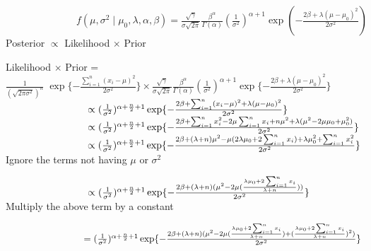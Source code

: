 \documentclass[]{article}
\begin{document}
$\hspace{3cm} f(\mu, \sigma^{2}\mid \mu_{0}, \lambda,\alpha,\beta) =  \frac{\sqrt{\gamma}}{\sigma\sqrt{2\pi}} \frac{\beta^{\alpha}}{\Gamma(\alpha)} (\frac{1}{\sigma^{2}})^{\alpha + 1} \exp(-\frac{2\beta + \lambda(\mu - \mu_{0})^{2}}{2\sigma^{2}}) $\\

Posterior $\propto$ Likelihood $\times$ Prior 

Likelihood $\times$ Prior = $\frac{1}{(\sqrt{2\pi \sigma^{2}})^{n}} \;\exp\{-\frac{\sum_{i=1}^{n}(x_{i}-\mu)^{2}}{2\sigma^{2}}\} \times \frac{\sqrt{\gamma}}{\sigma\sqrt{2\pi}} \frac{\beta^{\alpha}}{\Gamma(\alpha)} (\frac{1}{\sigma^{2}})^{\alpha + 1} \exp\{-\frac{2\beta + \lambda(\mu - \mu_{0})^{2}}{2\sigma^{2}}\}$\\

$\hspace{2.9cm} \propto (\frac{1}{\sigma^{2}})^{\alpha + \frac{n}{2} + 1} \exp\{-\frac{2\beta + \sum_{i=1}^{n}(x_{i}-\mu)^{2} + \lambda(\mu - \mu_{0})^{2}}{2\sigma^{2}}\}$\\

$\hspace{2.9cm} \propto (\frac{1}{\sigma^{2}})^{\alpha + \frac{n}{2} + 1} \exp\{-\frac{2\beta + \sum_{i=1}^{n}x_{i}^{2}- 2\mu\sum_{i=1}^{n}x_{i}+ n\mu^{2} + \lambda(\mu^{2} - 2\mu\mu_{0} + \mu_{0}^{2})}{2\sigma^{2}}\}$\\

$\hspace{2.9cm} \propto (\frac{1}{\sigma^{2}})^{\alpha + \frac{n}{2} + 1} \exp\{-\frac{2\beta + (\lambda + n)\mu^{2} - \mu(2\lambda\mu_{0} + 2\sum_{i=1}^{n} x_i) + \lambda\mu_{0}^{2} + \sum_{i=1}^{n} x_i^{2}}{2\sigma^{2}}\}$\\

Ignore the terms not having $\mu$ or $\sigma^{2}$

$\hspace{2.9cm} \propto (\frac{1}{\sigma^{2}})^{\alpha + \frac{n}{2} + 1} \exp\{-\frac{2\beta + (\lambda + n)(\mu^{2} - 2\mu(\frac{\lambda\mu_{0} + 2\sum_{i=1}^{n} x_i }{\lambda + n}))}{2\sigma^{2}}\}$\\

Multiply the above term by a constant

$\hspace{2.9cm} = (\frac{1}{\sigma^{2}})^{\alpha + \frac{n}{2} + 1} \exp\{-\frac{2\beta + (\lambda + n)(\mu^{2} - 2\mu(\frac{\lambda\mu_{0} + 2\sum_{i=1}^{n} x_i }{\lambda + n}) + (\frac{\lambda\mu_{0} + 2\sum_{i=1}^{n} x_i }{\lambda + n})^{2} )}{2\sigma^{2}}\}$
\end{document}
